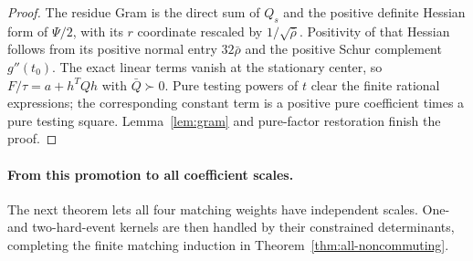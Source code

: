 \begin{proof}
The residue Gram is the direct sum of $Q_s$ and the positive definite Hessian form of $\Psi/2$, with its $r$ coordinate rescaled by $1/\sqrt{\bar\rho}$. Positivity of that Hessian follows from its positive normal entry $32\bar\rho$ and the positive Schur complement $g''(t_0)$. The exact linear terms vanish at the stationary center, so
$F/\tau=a+h^TQh$ with $\bar Q\succ0$. Pure testing powers of $t$ clear the finite rational expressions; the corresponding constant term is a positive pure coefficient times a pure testing square. Lemma~\ref{lem:gram} and pure-factor restoration finish the proof.
\end{proof}

\paragraph{From this promotion to all coefficient scales.}
The next theorem lets all four matching weights have independent scales. One- and two-hard-event kernels are then handled by their constrained determinants, completing the finite matching induction in Theorem~\ref{thm:all-noncommuting}.
